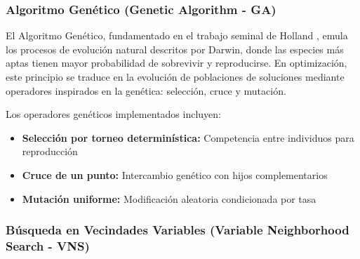\subsubsection{Algoritmo Genético (Genetic Algorithm - GA)}

El Algoritmo Genético, fundamentado en el trabajo seminal de Holland \cite{holland1992adaptation}, emula los procesos de evolución natural descritos por Darwin, donde las especies más aptas tienen mayor probabilidad de sobrevivir y reproducirse. En optimización, este principio se traduce en la evolución de poblaciones de soluciones mediante operadores inspirados en la genética: selección, cruce y mutación.

\begin{table}[htbp]
\centering
{}
\caption{Configuración de parámetros del algoritmo GA.}
\label{tab:parametros_ga}
\end{table}

Los operadores genéticos implementados incluyen:
\begin{itemize}
    \item \textbf{Selección por torneo determinística:} Competencia entre individuos para reproducción
    \item \textbf{Cruce de un punto:} Intercambio genético con hijos complementarios
    \item \textbf{Mutación uniforme:} Modificación aleatoria condicionada por tasa
\end{itemize}

\subsubsection{Búsqueda en Vecindades Variables (Variable Neighborhood Search - VNS)}


